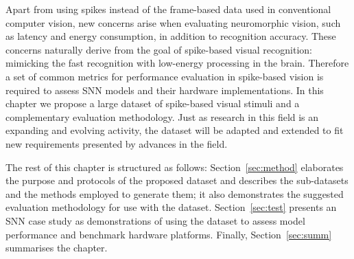 Apart from using spikes instead of the frame-based data used in conventional computer vision, new concerns arise when evaluating neuromorphic vision, such as latency and energy consumption, in addition to recognition accuracy.
These concerns naturally derive from the goal of spike-based visual recognition: mimicking the fast recognition with low-energy processing in the brain. 
Therefore a set of common metrics for performance evaluation in spike-based vision is required to assess SNN models and their hardware implementations.
In this chapter we propose a large dataset of spike-based visual stimuli and a complementary evaluation methodology.
Just as research in this field is an expanding and evolving activity, the dataset will be adapted and extended to fit new requirements presented by advances in the field.

The rest of this chapter is structured as follows: Section~\ref{sec:method} elaborates the purpose and protocols of the proposed dataset and describes the sub-datasets and the methods employed to generate them; it also demonstrates the suggested evaluation methodology for use with the dataset.
Section~\ref{sec:test} presents an SNN case study as demonstrations of using the dataset to assess model performance and benchmark hardware platforms.
Finally, Section~\ref{sec:summ} summarises the chapter.


